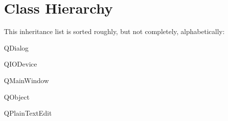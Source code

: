 \section{Class Hierarchy}
This inheritance list is sorted roughly, but not completely, alphabetically\+:\begin{DoxyCompactList}
\item {}
\item {}
\item {}
\item {}
\item Q\+Dialog\begin{DoxyCompactList}
\item {}
\end{DoxyCompactList}
\item Q\+I\+O\+Device\begin{DoxyCompactList}
\item {}
\end{DoxyCompactList}
\item Q\+Main\+Window\begin{DoxyCompactList}
\item {}
\end{DoxyCompactList}
\item Q\+Object\begin{DoxyCompactList}
\item {}
\end{DoxyCompactList}
\item Q\+Plain\+Text\+Edit\begin{DoxyCompactList}
\item {}
\end{DoxyCompactList}
\item {}
\end{DoxyCompactList}

